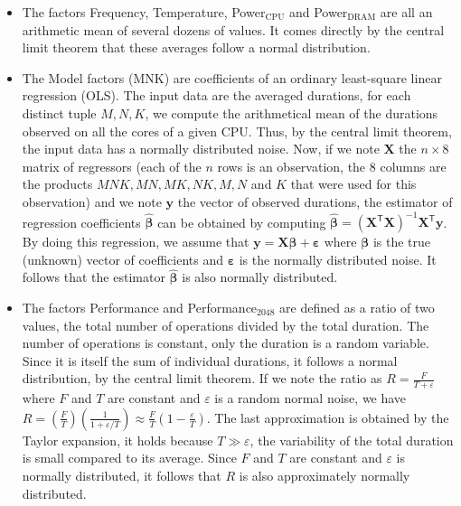             \begin{itemize}
                \item The factors Frequency, Temperature, Power$_{\text{CPU}}$ and Power$_{\text{DRAM}}$ are all an
                    arithmetic mean of several dozens of values. It comes directly by the central limit theorem that
                    these averages follow a normal distribution.
                \item The Model factors (\eg MNK) are coefficients of an ordinary least-square linear regression (OLS).
                    The input data are the averaged \dgemm durations, for each distinct tuple \(M,N,K\), we compute the
                    arithmetical mean of the durations observed on all the cores of a given CPU. Thus, by the central
                    limit theorem, the input data has a normally distributed noise. Now, if we note \(\bm{X}\) the
                    \(n\times8\) matrix of regressors (each of the \(n\) rows is an observation, the 8 columns are the
                    products \(MNK, MN, MK, NK, M, N\) and \(K\) that were used for this observation) and we note
                    \(\bm{y}\) the vector of observed durations, the estimator of regression coefficients
                    \(\hat{\bm{\beta}}\) can be obtained by computing \(\hat{\bm{\beta}} = \left( \bm{X}^{\mathsf T}
                    \bm{X} \right)^{-1} \bm{X}^{\mathsf T} \bm{y} \).  By doing this regression, we assume that \(\bm{y}
                    = \bm{X}\bm{\beta} + \bm{\varepsilon}\) where \(\bm{\beta}\) is the true (unknown) vector of coefficients
                    and \(\bm{\varepsilon}\) is the normally distributed noise. It follows that the estimator
                    \(\hat{\bm{\beta}}\) is also normally distributed.
                \item The factors Performance and Performance\(_{2048}\) are defined as a ratio of two values, the total
                    number of operations divided by the total duration. The number of operations is constant, only the
                    duration is a random variable. Since it is itself the sum of individual durations, it follows a
                    normal distribution, by the central limit theorem. If we note the ratio as
                    \(R=\frac{F}{T+\varepsilon}\) where \(F\) and \(T\) are constant and \(\varepsilon\) is a random
                    normal noise, we have \(R = \left(\frac{F}{T}\right) \left(\frac{1}{1+\varepsilon/T}\right)
                    \approx \frac{F}{T}\left(1-\frac{\varepsilon}{T}\right)\). The last approximation is obtained by the
                    Taylor expansion, it holds because \(T \gg \varepsilon\), \ie the variability of the total duration
                    is small compared to its average. Since \(F\) and \(T\) are constant and \(\varepsilon\) is normally
                    distributed, it follows that \(R\) is also approximately normally distributed.
            \end{itemize}

